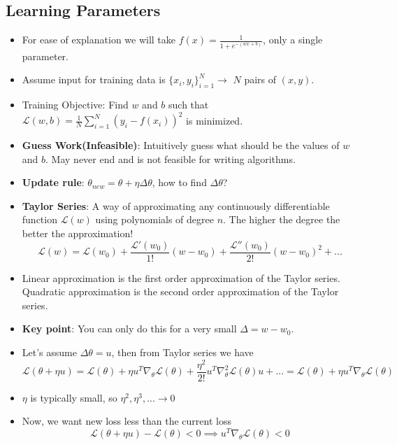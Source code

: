 \documentclass[a4paper]{article}
\begin{document}
\subsection{Learning Parameters}
\begin{itemize}
    \item For ease of explanation we will take $f(x)=\frac{1}{1+e^{-(wx+b)}}$, only a single parameter.
    \item Assume input for training data is $\{x_i,y_i\}_{i=1}^N\rightarrow$ $N$ pairs of $(x,y)$.
    \item Training Objective: Find $w$ and $b$ such that $\mathcal{L}(w,b)=\frac{1}{N}\sum_{i=1}^N(y_i-f(x_i))^2$ is minimized.
    \item \textbf{Guess Work(Infeasible)}: Intuitively guess what should be the values of $w$ and $b$. May never end and is not feasible for writing algorithms.
    \item \textbf{Update rule}: $\theta_{new}=\theta + \eta \Delta \theta$, how to find $\Delta \theta$?
    \item \textbf{Taylor Series}: A way of approximating any continuously differentiable function $\mathcal{L}(w)$ using polynomials of degree $n$. The higher the degree the better the approximation!
    \begin{equation*}
        \mathcal{L}(w)=\mathcal{L}(w_0)+\frac{\mathcal{L}'(w_0)}{1!}(w-w_0)+\frac{\mathcal{L}''(w_0)}{2!}(w-w_0)^2+...
    \end{equation*}
    \item Linear approximation is the first order approximation of the Taylor series. Quadratic approximation is the second order approximation of the Taylor series.
    \item \textbf{Key point}: You can only do this for a very small $\Delta=w-w_0$.
    \item Let's assume $\Delta \theta=u$, then from Taylor series we have
    \begin{equation*}
        \mathcal{L}(\theta+\eta u)=\mathcal{L}(\theta)+\eta u^T\nabla_\theta \mathcal{L}(\theta)+\frac{\eta^2}{2!}u^T\nabla_\theta^2\mathcal{L}(\theta)u+... = \mathcal{L}(\theta)+\eta u^T\nabla_\theta \mathcal{L}(\theta)
    \end{equation*}
    \item $\eta$ is typically small, so $\eta^2, \eta^3,...\rightarrow 0$
    \item Now, we want new loss less than the current loss
    \begin{equation*}
        \mathcal{L}(\theta+\eta u)-\mathcal{L}(\theta)<0\implies u^T\nabla_\theta \mathcal{L}(\theta)<0

\end{equation*}
\end{itemize}
\end{document}
